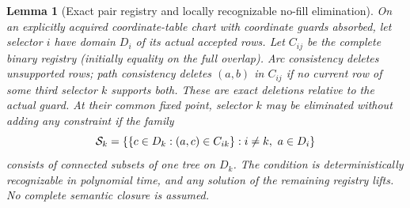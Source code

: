 \documentclass[11pt]{article}
\newtheorem{lemma}[theorem]{Lemma}
\begin{document}
\begin{lemma}[Exact pair registry and locally recognizable no-fill elimination]\label{lem:ds18-tree}
On an explicitly acquired coordinate-table chart with coordinate guards absorbed, let selector $i$ have domain $D_i$ of its actual accepted rows. Let $C_{ij}$ be the complete binary registry (initially equality on the full overlap). Arc consistency deletes unsupported rows; path consistency deletes $(a,b)$ in $C_{ij}$ if no current row of some third selector $k$ supports both. These are exact deletions relative to the actual guard. At their common fixed point, selector $k$ may be eliminated without adding any constraint if the family
\[
{\cal S}_k=\{\{c\in D_k:(a,c)\in C_{ik}\}:i\ne k,\ a\in D_i\}
\]
consists of connected subsets of one tree on $D_k$. The condition is deterministically recognizable in polynomial time, and any solution of the remaining registry lifts. No complete semantic closure is assumed.
\end{lemma}
\end{document}
